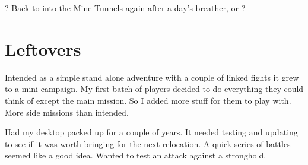 ? Back to into the Mine Tunnels again after a day's breather, or ?













\clearpage
{}
\section*{Leftovers}
Intended as a simple stand alone adventure with a couple of linked fights it grew to a mini-campaign.
My first batch of players decided to do everything they could think of except the main mission. So I added more stuff for them to play with. More side missions than intended.

Had my desktop packed up for a couple of years. It needed testing and updating to see if it was worth bringing for the next relocation. A quick series of battles seemed like a good idea. Wanted to test an attack against a stronghold.


















